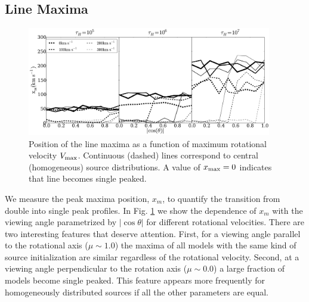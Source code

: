 \subsection{Line Maxima}
\label{sec:maxima}
\begin{figure}
\begin{center}
\includegraphics[width=0.95\textwidth]{../Figures/f8.pdf}
\end{center}
\caption{Position of the line maxima as a function of maximum
rotational velocity $V_{\rm max}$. Continuous (dashed) lines
correspond to central (homogeneous) source distributions. A value
of $x_{\rm max}=0$ indicates that line becomes single
peaked. \label{fig:maximumvsvelocity}}
\end{figure}
We measure the peak maxima position, $x_m$, to quantify the transition from
double into single peak profiles.
In Fig. \ref{fig:maximumvsvelocity} we show the dependence of $x_m$ with
the viewing angle parametrized by $|\cos\theta|$ for different
rotational velocities.
There are two interesting features that deserve attention.
First, for a viewing angle parallel to the rotational axis ($\mu\sim
1.0$) the maxima of all models with the same kind of source
initialization are similar regardless of the rotational velocity.
Second, at a viewing angle perpendicular to the rotation axis ($\mu\sim 0.0$) a
large fraction of models become single peaked.
This feature appears more frequently for homogeneously distributed
sources if all the other parameters are equal.
